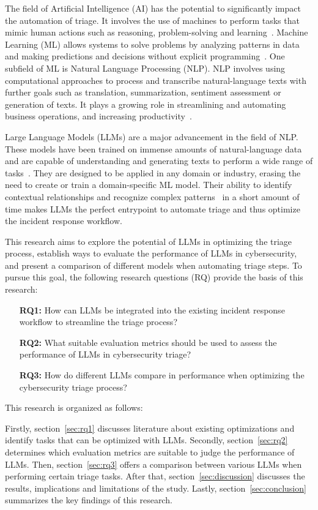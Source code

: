 The field of Artificial Intelligence (AI) has the potential to significantly impact the automation of triage.
It involves the use of machines to perform tasks that mimic human actions such as reasoning, problem-solving and
learning\ \citep{oed:ai}.
Machine Learning (ML) allows systems to solve problems by analyzing patterns in data and making
predictions and decisions without explicit programming\ \citep{oed:ml}.
One subfield of ML is Natural Language Processing (NLP).
NLP involves using computational approaches to process and transcribe natural-language texts with further goals such as
translation, summarization, sentiment assessment or generation of texts.
It plays a growing role in streamlining and automating business operations, and increasing
productivity\ \citep{ibm:nlp}.

Large Language Models (LLMs) are a major advancement in the field of NLP\@.
These models have been trained on immense amounts of natural-language data and are capable of understanding and
generating texts to perform a wide range of tasks\ \citep{ibm:llm}.
They are designed to be applied in any domain or industry, erasing the need to create or train a domain-specific ML
model.
Their ability to identify contextual relationships and recognize complex patterns\ \citep{bordt2024data} in a short
amount of time makes LLMs the perfect entrypoint to automate triage and thus optimize the incident response workflow.

This research aims to explore the potential of LLMs in optimizing the triage process, establish ways to
evaluate the performance of LLMs in cybersecurity, and present a comparison of different models when automating triage
steps.
To pursue this goal, the following research questions (RQ) provide the basis of this research:

\begin{itemize}
    \item[\textbf{RQ1:}] How can LLMs be integrated into the existing incident response workflow to streamline the
    triage process?
    \item[\textbf{RQ2:}] What suitable evaluation metrics should be used to assess the performance of LLMs in
    cybersecurity triage?
    \item[\textbf{RQ3:}] How do different LLMs compare in performance when optimizing the cybersecurity triage process?
\end{itemize}

This research is organized as follows:

Firstly, section\ \ref{sec:rq1} discusses literature about existing optimizations and identify tasks that can
be optimized with LLMs.
Secondly, section\ \ref{sec:rq2} determines which evaluation metrics are suitable to judge the performance of LLMs.
Then, section\ \ref{sec:rq3} offers a comparison between various LLMs when performing certain triage tasks.
After that, section\ \ref{sec:discussion} discusses the results, implications and limitations of the study.
Lastly, section\ \ref{sec:conclusion} summarizes the key findings of this research.